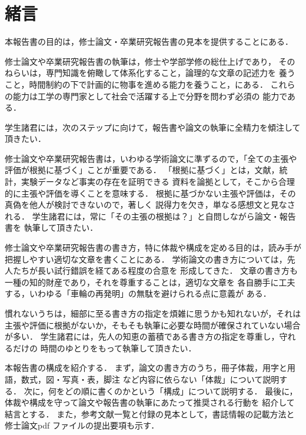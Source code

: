 \documentclass[main]{subfiles}
\begin{document}
\chapter{緒言}
本報告書の目的は，修士論文・卒業研究報告書の見本を提供することにある．


修士論文や卒業研究報告書の執筆は，修士や学部学修の総仕上げであり，
そのねらいは，専門知識を俯瞰して体系化すること，論理的な文章の記述力を
養うこと，時間制約の下で計画的に物事を進める能力を養うこと，にある．
これらの能力は工学の専門家として社会で活躍する上で分野を問わず必須の
能力である．


学生諸君には，次のステップに向けて，報告書や論文の執筆に全精力を傾注して
頂きたい．

修士論文や卒業研究報告書は，いわゆる学術論文に準ずるので，「全ての主張や
評価が根拠に基づく」ことが重要である．
「根拠に基づく」とは，文献，統計，実験データなど事実の存在を証明できる
資料を論拠として，そこから合理的に主張や評価を導くことを意味する．
根拠に基づかない主張や評価は，その真偽を他人が検討できないので，著しく
説得力を欠き，単なる感想文と見なされる．
学生諸君には，常に「その主張の根拠は？」と自問しながら論文・報告書を
執筆して頂きたい．

修士論文や卒業研究報告書の書き方，特に体裁や構成を定める目的は，読み手が
把握しやすい適切な文章を書くことにある．
学術論文の書き方については，先人たちが長い試行錯誤を経てある程度の合意を
形成してきた．
文章の書き方も一種の知的財産であり，それを尊重することは，適切な文章を
各自勝手に工夫する，いわゆる「車輪の再発明」の無駄を避けられる点に意義が
ある．

慣れないうちは，細部に至る書き方の指定を煩雑に思うかも知れないが，それは
主張や評価に根拠がないか，そもそも執筆に必要な時間が確保されていない場合
が多い．
学生諸君には，先人の知恵の蓄積である書き方の指定を尊重し，守れるだけの
時間のゆとりをもって執筆して頂きたい．

本報告書の構成を紹介する．
まず，論文の書き方のうち，冊子体裁，用字と用語，数式，図・写真・表，脚注
など内容に依らない「体裁」について説明する．
次に，何をどの順に書くのかという「構成」について説明する．
最後に，体裁や構成を守って論文や報告書の執筆にあたって推奨される行動を
紹介して結言とする．
また，参考文献一覧と付録の見本として，書誌情報の記載方法と修士論文pdf
ファイルの提出要項も示す．
\end{document}

